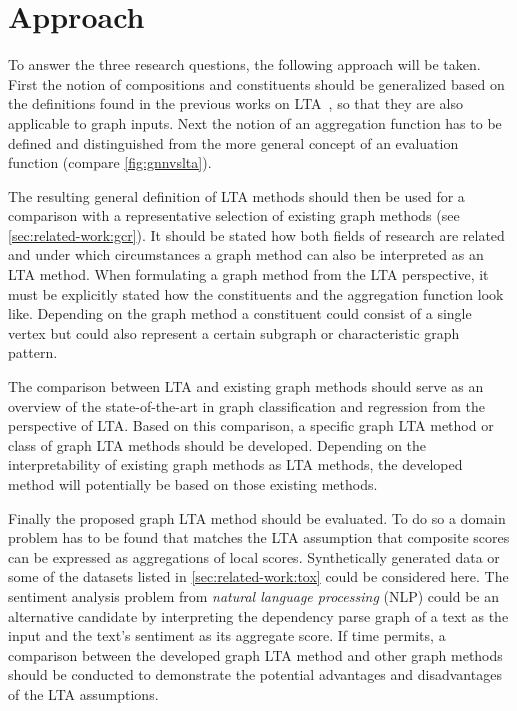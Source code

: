 \documentclass[12pt]{scrartcl}
\begin{document}
\section{Approach}%
\label{sec:approach}

To answer the three research questions, the following approach will be taken.
First the notion of compositions and constituents should be generalized based on the definitions found in the previous works on LTA~\cite{Melnikov2016}\cite{Melnikov2019}, so that they are also applicable to graph inputs.
Next the notion of an aggregation function has to be defined and distinguished from the more general concept of an evaluation function (compare \cref{fig:gnnvslta}).

The resulting general definition of LTA methods should then be used for a comparison with a representative selection of existing graph methods (see \cref{sec:related-work:gcr}).
It should be stated how both fields of research are related and under which circumstances a graph method can also be interpreted as an LTA method.
When formulating a graph method from the LTA perspective, it must be explicitly stated how the constituents and the aggregation function look like.
Depending on the graph method a constituent could consist of a single vertex but could also represent a certain subgraph or characteristic graph pattern.

The comparison between LTA and existing graph methods should serve as an overview of the state-of-the-art in graph classification and regression from the perspective of LTA.\@
Based on this comparison, a specific graph LTA method or class of graph LTA methods should be developed.
Depending on the interpretability of existing graph methods as LTA methods, the developed method will potentially be based on those existing methods.

Finally the proposed graph LTA method should be evaluated.
To do so a domain problem has to be found that matches the LTA assumption that composite scores can be expressed as aggregations of local scores.
Synthetically generated data or some of the datasets listed in \cref{sec:related-work:tox} could be considered here.
The sentiment analysis problem from \textit{natural language processing} (NLP) could be an alternative candidate by interpreting the dependency parse graph of a text as the input and the text's sentiment as its aggregate score.
If time permits, a comparison between the developed graph LTA method and other graph methods should be conducted to demonstrate the potential advantages and disadvantages of the LTA assumptions.
\end{document}
